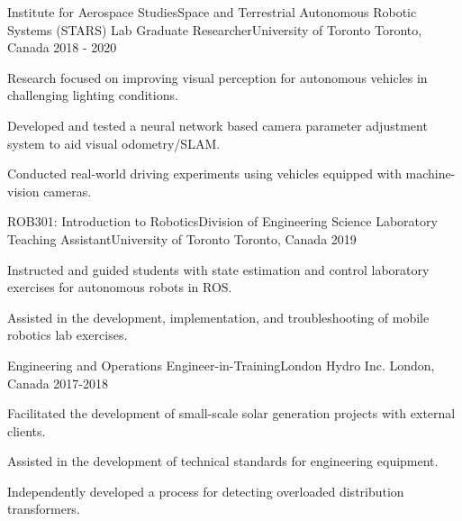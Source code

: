 

\begin{cventries}

  \cventry
    {Institute for Aerospace Studies{\enskip\cdotp\enskip}Space and Terrestrial Autonomous Robotic Systems (STARS) Lab} %
    {Graduate Researcher{\enskip\cdotp\enskip}University of Toronto} %
    {Toronto, Canada} %
    {2018 - 2020} %
    {
      \begin{cvitems} %
        \item {Research focused on improving visual perception for autonomous vehicles in challenging lighting conditions.}
        \item {Developed and tested a neural network based camera parameter adjustment system to aid visual odometry/SLAM.}
        \item {Conducted real-world driving experiments using vehicles equipped with machine-vision cameras.}
      \end{cvitems}
    }
    
  \cventry
    {ROB301: Introduction to Robotics{\enskip\cdotp\enskip}Division of Engineering Science} %
    {Laboratory Teaching Assistant{\enskip\cdotp\enskip}University of Toronto} %
    {Toronto, Canada} %
    {2019} %
    {
      \begin{cvitems} %
        \item {Instructed and guided students with state estimation and control laboratory exercises for autonomous robots in ROS.}
        \item {Assisted in the development, implementation, and troubleshooting of mobile robotics lab exercises.}
      \end{cvitems}
    }
    
  \cventry
	{Engineering and Operations} %
	{Engineer-in-Training{\enskip\cdotp\enskip}London Hydro Inc.} %
	{London, Canada} %
	{2017-2018} %
	{
	  \begin{cvitems} %
	  	\item {Facilitated the development of small-scale solar generation projects with external clients.}
        \item {Assisted in the development of technical standards for engineering equipment.}
        \item {Independently developed a process for detecting overloaded distribution transformers.}
	  \end{cvitems}
    }

\end{cventries}
